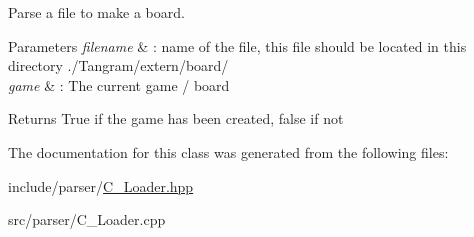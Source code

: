 Parse a file to make a board. 


\begin{DoxyParams}{Parameters}
{\em filename} & \+: name of the file, this file should be located in this directory ./\+Tangram/extern/board/ \\
\hline
{\em game} & \+: The current game / board \\
\hline
\end{DoxyParams}
\begin{DoxyReturn}{Returns}
True if the game has been created, false if not 
\end{DoxyReturn}


The documentation for this class was generated from the following files\+:\begin{DoxyCompactItemize}
\item 
include/parser/\hyperlink{Loader_8hpp}{C_Loader.\+hpp}\item
src/parser/C_Loader.\+cpp\end{DoxyCompactItemize}
